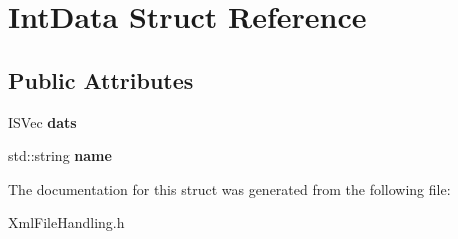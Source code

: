 \hypertarget{structIntData}{
\section{IntData Struct Reference}
\label{structIntData}
}
\subsection*{Public Attributes}
\begin{DoxyCompactItemize}
\item 
\hypertarget{structIntData_a16f155b3d523598cca522fa9aad1ef8a}{
ISVec {\bfseries dats}}
\label{structIntData_a16f155b3d523598cca522fa9aad1ef8a}

\item 
\hypertarget{structIntData_a5ec8b8c6736d125091aceb85d9688ff0}{
std::string {\bfseries name}}
\label{structIntData_a5ec8b8c6736d125091aceb85d9688ff0}

\end{DoxyCompactItemize}


The documentation for this struct was generated from the following file:\begin{DoxyCompactItemize}
\item 
XmlFileHandling.h\end{DoxyCompactItemize}
